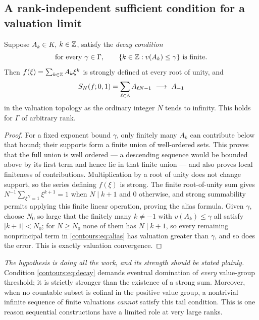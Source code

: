 \documentclass[11pt,letterpaper]{article}
\theoremstyle{definition}
\theoremstyle{remark}
\numberwithin{equation}{section}
\begin{document}
\subsection{A rank-independent sufficient condition for a valuation limit}
\begin{proposition}
\label{contours:prop:samplingcriterion}
Suppose $A_k\in K$, $k\in\mathbb Z$, satisfy the \emph{decay condition}
\begin{equation}\label{contours:eq:decay}
  \text{for every }\gamma\in\Gamma,\qquad
  \{k\in\mathbb Z:v(A_k)\le\gamma\}\ \text{is finite}.
\end{equation}
Then $f(\xi)=\sum_{k\in\mathbb Z}A_k\xi^k$ is strongly defined at every root of unity, and
\begin{equation}\label{contours:eq:alias}
  S_N(f;0,1)=\sum_{\ell\in\Z}A_{\ell N-1}\ \longrightarrow\ A_{-1}
\end{equation}
in the valuation topology as the ordinary integer $N$ tends to infinity. This holds
for $\Gamma$ of arbitrary rank.
\end{proposition}
\begin{proof}
For a fixed exponent bound $\gamma$, only finitely many $A_k$ can contribute below
that bound; their supports form a finite union of well-ordered sets. This proves
that the full union is well ordered --- a descending sequence would be bounded above
by its first term and hence lie in that finite union --- and also proves local
finiteness of contributions. Multiplication by a root of unity does not change
support, so the series defining $f(\xi)$ is strong. The finite root-of-unity sum
gives $N^{-1}\sum_{\xi^N=1}\xi^{k+1}=1$ when $N\mid k+1$ and $0$ otherwise, and
strong summability permits applying this finite linear operation, proving the alias
formula. Given $\gamma$, choose $N_0$ so large that the finitely many $k\ne-1$ with
$v(A_k)\le\gamma$ all satisfy $|k+1|<N_0$; for $N\ge N_0$ none of them has
$N\mid k+1$, so every remaining nonprincipal term in \eqref{contours:eq:alias} has
valuation greater than $\gamma$, and so does the error. This is exactly valuation
convergence.
\end{proof}

\emph{The hypothesis is doing all the work, and its strength should be stated
plainly.} Condition \eqref{contours:eq:decay} demands eventual domination of
\emph{every} value-group threshold; it is strictly stronger than the existence of a
strong sum. Moreover, when no countable subset is cofinal in the positive value
group, a nontrivial infinite sequence of finite valuations \emph{cannot} satisfy
this tail condition. This is one reason sequential constructions have a limited role
at very large ranks.
\end{document}
